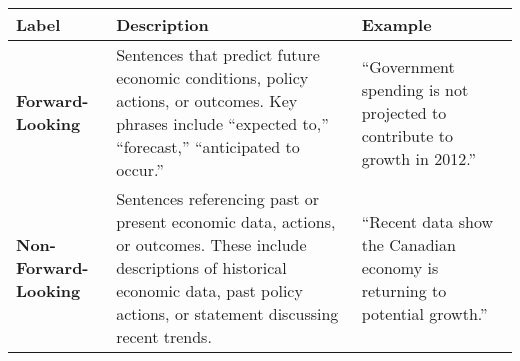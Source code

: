 
\begin{table*}
    \caption{}
    \vspace{1em}
    \begin{tabular}{p{}p{}p{}}
    \toprule
    \textbf{Label} & \textbf{Description} & \textbf{Example} \\
    \midrule
    \textbf{Forward-Looking} & Sentences that predict future economic conditions, policy actions, or outcomes. Key phrases include ``expected to,'' ``forecast,'' ``anticipated to occur.'' & ``Government spending is not projected to contribute to growth in 2012.'' \\
    \midrule
    \textbf{Non-Forward-Looking} & Sentences referencing past or present economic data, actions, or outcomes. These include descriptions of historical economic data, past policy actions, or statement discussing recent trends. & ``Recent data show the Canadian economy is returning to potential growth.'' \\
    \bottomrule
    \end{tabular}
    \label{tb:boc_forward_looking_guide}
\end{table*}